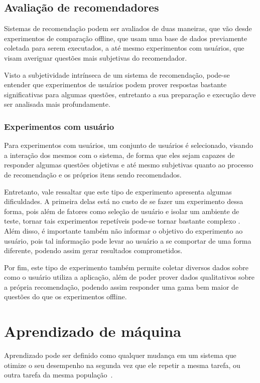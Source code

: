 \subsection{Avaliação de recomendadores}

Sistemas de recomendação podem ser avaliados de duas maneiras, que vão desde
experimentos de comparação offline, que usam uma base de dados previamente
coletada para serem executados, a até mesmo experimentos com usuários, que visam
averiguar questões mais subjetivas do recomendador.

Visto a subjetividade intrínseca de um sistema de recomendação, pode-se entender
que experimentos de usuários podem prover respostas bastante significativas para
algumas questões, entretanto a sua preparação e execução deve ser analisada mais
profundamente.

\subsubsection{Experimentos com usuário}

Para experimentos com usuários, um conjunto de usuários é selecionado, visando
a interação dos mesmos com o sistema, de forma que eles sejam capazes de responder algumas
questões objetivas e até mesmo subjetivas quanto ao processo de recomendação e
os próprios itens sendo recomendados.

Entretanto, vale ressaltar que este tipo de experimento apresenta algumas
dificuldades. A primeira delas está no custo de se fazer um experimento dessa
forma, pois além de fatores como seleção de usuário e isolar um ambiente de
teste, tornar tais experimentos repetíveis pode-se tornar bastante complexo
\cite{shani2011evaluating}. Além disso, é importante também não informar o
objetivo do experimento ao usuário, pois tal informação pode levar ao usuário a
se comportar de uma forma diferente, podendo assim gerar resultados
comprometidos.

Por fim, este tipo de experimento também permite coletar diversos dados sobre
como o usuário utiliza a aplicação, além de poder prover dados qualitativos
sobre a própria recomendação, podendo assim responder uma gama bem maior de
questões do que os experimentos offline.


\section{Aprendizado de máquina}

Aprendizado pode ser definido como qualquer mudança em um sistema que
otimize o seu desempenho na segunda vez que ele repetir a mesma tarefa,
ou outra tarefa da mesma população~\cite{custodio2010aprendizadomaquina}.

